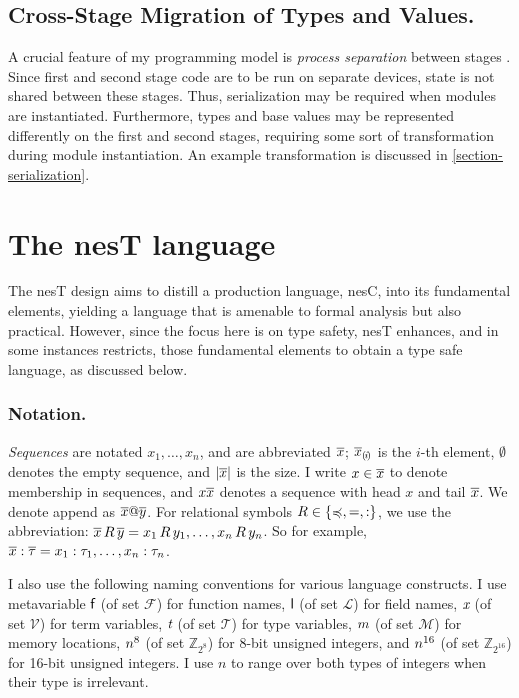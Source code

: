 \subsection{Cross-Stage Migration of Types and Values.} 

A crucial feature of my programming model is \emph{process separation} between stages
\cite{FramedML}. Since first and second stage code are to be run on separate devices, state is
not shared between these stages. Thus, serialization may be required when modules are
instantiated. Furthermore, types and base values may be represented differently on the first and
second stages, requiring some sort of transformation during module instantiation. An example
transformation is discussed in \autoref{section-serialization}.

\section{The nesT language}
\label{section-nest-theory}
 
\syntaxfig

The nesT design aims to distill a production language, nesC, into its fundamental elements,
yielding a language that is amenable to formal analysis but also practical. However, since the
focus here is on type safety, nesT enhances, and in some instances restricts, those fundamental
elements to obtain a type safe language, as discussed below.

\subsubsection{Notation.} \emph{Sequences} are notated $x_1,\ldots,x_n$, and are abbreviated
$\overline{x}$; $\overline{x}_{(\mskip -2.5mu i\mskip -2.5mu)}$ is the $i$-th element, $\emptyset$ denotes the empty sequence,
and $|\overline{x}|$ is the size. I write $x \in \overline{x}$ to denote membership in sequences,
and $x\overline{x}$ denotes a sequence with head $x$ and tail $\overline{x}$. We denote append as
$\overline{x}@\overline{y}$. For relational symbols $R \in \{ \preccurlyeq, =, : \}$, we use the
abbreviation: $\overline{x}\, R\, \overline{y} = x_1\, R\, y_1, \ldots, x_n\, R\, y_n$. So for example,
$\overline{x} : \overline{\tau} = x_1 : \tau_1,\ldots,x_n : \tau_n$.

I also use the following naming conventions for various language constructs. I use metavariable
$\textsf{f}$ (of set $\mathcal{F}$) for function names, $\textsf{l}$ (of set $\mathcal{L}$) for field
names, $\textit{x}$ (of set $\mathcal{V}$) for term variables, $\textit{t}$ (of set $\mathcal{T}$) for type
variables, $ m$ (of set $\mathcal{M}$) for memory locations, $n^{8}$ (of set
$\mathbb{Z}_{2^8}$) for 8-bit unsigned integers, and $n^{16}$ (of set $\mathbb{Z}_{2^{16}}$)
for 16-bit unsigned integers. I use $n$ to range over both types of integers when their type is
irrelevant.


